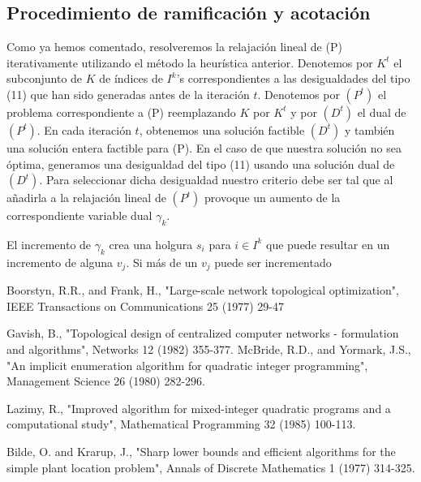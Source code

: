 \documentclass[twoside,12pt]{article}
\begin{document}
\subsection{Procedimiento de ramificación y acotación}
Como ya hemos comentado, resolveremos la relajación lineal de (P) iterativamente utilizando el método la heurística anterior. Denotemos por $K^t$ el subconjunto de $K$ de índices de $I^k$'s correspondientes a las desigualdades del tipo (11) que han sido generadas antes de la iteración $t$. Denotemos por $(P^t)$ el problema correspondiente a (P) reemplazando $K$ por $K^t$ y por $(D^t)$ el dual de $(P^t)$. En cada iteración $t$, obtenemos una solución factible $(D^t)$ y también una solución entera factible para (P). En el caso de que nuestra solución no sea óptima, generamos una desigualdad del tipo (11) usando una solución dual de $(D^t)$. Para seleccionar dicha desigualdad nuestro criterio debe ser tal que al añadirla a la relajación lineal de $(P^t)$ provoque un aumento de la correspondiente variable dual $\gamma_k$. 

El incremento de $\gamma_k$ crea una holgura $s_i$ para $i\in I^k$ que puede resultar en un incremento de alguna $v_j$. Si más de un $v_j$ puede ser incrementado 
\newpage
\begin{thebibliography}{9}
Boorstyn, R.R., and Frank, H., "Large-scale network
topological optimization", IEEE Transactions on Communications
25 (1977) 29-47

Gavish, B., "Topological design of centralized computer
networks - formulation and algorithms", Networks 12
(1982) 355-377. 
McBride, R.D., and Yormark, J.S., "An implicit enumeration algorithm for quadratic integer programming", Management Science 26 (1980) 282-296.

Lazimy, R., "Improved algorithm for mixed-integer quadratic programs and a computational study", Mathematical Programming 32 (1985) 100-113.

Bilde, O. and Krarup, J., "Sharp lower bounds and
efficient algorithms for the simple plant location problem",
Annals of Discrete Mathematics 1 (1977) 314-325.
\end{thebibliography} 
\end{document}
